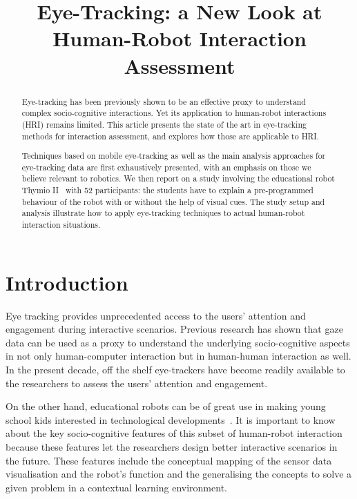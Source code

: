 \documentclass{sig-alternate}
\title{\LARGE \bf
    Eye-Tracking: a New Look at Human-Robot Interaction Assessment
}
\begin{document}
\maketitle
\begin{abstract}


Eye-tracking has been previously shown to be an effective proxy to understand
complex socio-cognitive interactions. Yet its application to human-robot
interactions (HRI) remains limited. This article presents the state of the
art in eye-tracking methods for interaction assessment, and explores how those
are applicable to HRI.

Techniques based on mobile eye-tracking as well as the main analysis approaches
for eye-tracking data are first exhaustively presented, with an emphasis on
those we believe relevant to robotics. We then report on a study involving the
educational robot Thymio II~\cite{riedo2012two} with 52 participants: the
students have to explain a pre-programmed behaviour of the robot with or without
the help of visual cues. The study setup and analysis illustrate how to apply
eye-tracking techniques to actual human-robot interaction situations.

\end{abstract}
\section{Introduction}

Eye tracking provides unprecedented access to the users' attention and
engagement during interactive scenarios. Previous research \cite{hasse2012measure,tien2010measuring,jermann2010using,sharma2012gaze} has shown
that gaze data can be used as a proxy to understand the underlying
socio-cognitive aspects in not only human-computer interaction but in
human-human interaction as well. In the present decade, off the shelf
eye-trackers have become readily available to the researchers to assess
the users' attention and engagement.

On the other hand, educational robots can be of great use in making young school
kids interested in technological developments~\cite{cooper1999robots,
wyffels2010building}. It is important to know about the key socio-cognitive
features of this subset of human-robot interaction because these features let
the researchers design better interactive scenarios in the future. These
features include the conceptual mapping of the sensor data visualisation and the
robot's function and the generalising the concepts to solve a given problem in a
contextual learning environment.
\end{document}
